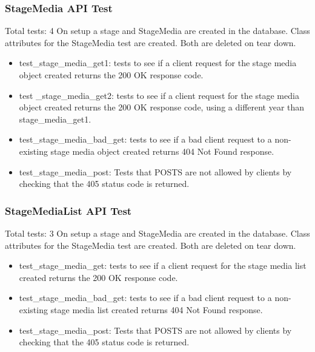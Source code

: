 \documentclass[12pt,english]{scrartcl}
\begin{document}
\subsubsection{StageMedia API Test} 
Total tests: 4
On setup a stage and StageMedia are created in the database. Class attributes for the StageMedia test are created.
Both are deleted on tear down.
\begin{itemize}
 \item test\_stage\_media\_get1: tests to see if a client request for the stage media object created returns the 200 OK response code.
 
 \item test \_stage\_media\_get2: tests to see if a client request for the stage media object created returns the 200 OK response code, using a different year than stage_media_get1.
 
 \item test\_stage\_media\_bad\_get: tests to see if a bad client request to a non-existing stage media object created returns 
                                     404 Not Found response.
 
 \item test\_stage\_media\_post: Tests that POSTS are not allowed by clients by checking that the 405 status code is returned.
\end{itemize}

\subsubsection{StageMediaList API Test}
Total tests: 3
On setup a stage and StageMedia are created in the database. Class attributes for the StageMedia test are created.
Both are deleted on tear down.
\begin{itemize}
\item test\_stage\_media\_get: tests to see if a client request for the stage media list created returns the 200 OK response code.

\item test\_stage\_media\_bad\_get: tests to see if a bad client request to a non-existing stage media list created returns
                                     404 Not Found response.
\item test\_stage\_media\_post: Tests that POSTS are not allowed by clients by checking that the 405 status code is returned.
\end{itemize}
\end{document}
